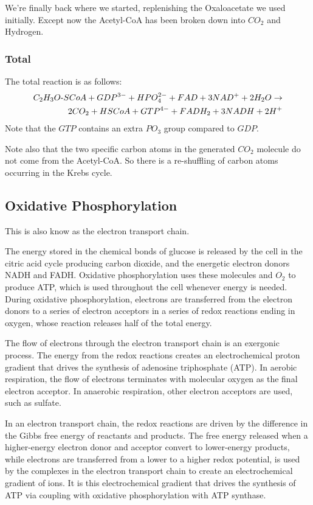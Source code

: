 \documentclass{article}
\def\mhyphen{{\hbox{-}}}
\begin{document}
We're finally back where we started, replenishing the Oxaloacetate we used initially.
Except now the Acetyl-CoA has been broken down into $CO_2$ and Hydrogen.

\subsubsection{Total}
The total reaction is as follows:
\[
    \begin{split}
    C_2H_3O{\mhyphen}SCoA + GDP^{3-}+ HPO_4^{2-} + FAD + 3NAD^+ + 2H_2O \rightarrow \\
    2CO_2 + HSCoA + GTP^{4-} + FADH_2 + 3NADH + 2H^+
    \end{split}
\]
Note that the $GTP$ contains an extra $PO_3$ group compared to $GDP$.

Note also that the two specific carbon atoms in the generated $CO_2$ molecule do not come
from the Acetyl-CoA. So there is a re-shuffling of carbon atoms occurring in the Krebs
cycle.

\subsection{Oxidative Phosphorylation}
This is also know as the electron transport chain.

The energy stored in the chemical bonds of glucose is released by the cell in the citric
acid cycle producing carbon dioxide, and the energetic electron donors NADH and FADH\@.
Oxidative phosphorylation uses these molecules and $O_2$ to produce ATP, which is used
throughout the cell whenever energy is needed. During oxidative phosphorylation, electrons
are transferred from the electron donors to a series of electron acceptors in a series of
redox reactions ending in oxygen, whose reaction releases half of the total energy.

The flow of electrons through the electron transport chain is an exergonic process. The
energy from the redox reactions creates an electrochemical proton gradient that drives the
synthesis of adenosine triphosphate (ATP). In aerobic respiration, the flow of electrons
terminates with molecular oxygen as the final electron acceptor. In anaerobic respiration,
other electron acceptors are used, such as sulfate.

In an electron transport chain, the redox reactions are driven by the difference in the
Gibbs free energy of reactants and products. The free energy released when a higher-energy
electron donor and acceptor convert to lower-energy products, while electrons are
transferred from a lower to a higher redox potential, is used by the complexes in the
electron transport chain to create an electrochemical gradient of ions. It is this
electrochemical gradient that drives the synthesis of ATP via coupling with oxidative
phosphorylation with ATP synthase.
\end{document}
